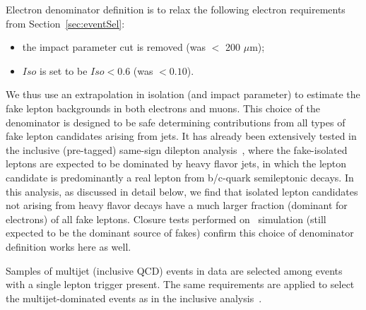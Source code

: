 Electron denominator definition is to relax the following electron requirements from
Section~\ref{sec:eventSel}:
\begin{itemize}
\item the impact parameter cut is removed (was $<$ 200 $\mu$m);
\item $Iso$ is set to be $Iso < 0.6$ (was $<0.10$).
\end{itemize}

We thus use an extrapolation  in isolation (and impact parameter) to estimate the fake lepton backgrounds 
in both electrons and muons.
This choice of the denominator is designed to be safe determining contributions
from all types of fake lepton candidates arising from jets.
It has already been extensively tested in the inclusive (pre-tagged) same-sign dilepton analysis~\cite{ssnote2011},
where the fake-isolated leptons are expected to be dominated by
heavy flavor jets, in which the lepton candidate is predominantly a real lepton from b/c-quark semileptonic decays.
In this analysis, as discussed in detail below, we find that isolated lepton candidates
not arising from heavy flavor decays have a much larger fraction (dominant for electrons) of all fake leptons.
Closure tests performed on \ttbar\ simulation (still expected to be the dominant source of fakes)
confirm this choice of denominator definition works here as well.

Samples of multijet (inclusive QCD) events in data are selected among events with a single lepton trigger present.
The same requirements are applied to select the multijet-dominated events as in the inclusive analysis~\cite{ssnote2011}.


